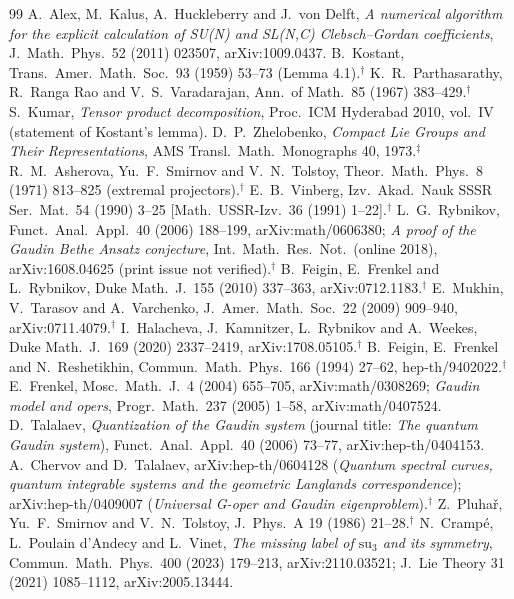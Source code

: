 \documentclass[11pt]{article}
\begin{document}
{\scriptsize
\begin{thebibliography}{99}
 A.~Alex, M.~Kalus, A.~Huckleberry and J.~von Delft, \emph{A numerical algorithm for the explicit calculation of SU(N) and SL(N,C) Clebsch--Gordan coefficients}, J.~Math.\ Phys.\ 52 (2011) 023507, arXiv:1009.0437.
 B.~Kostant, Trans.\ Amer.\ Math.\ Soc.\ 93 (1959) 53--73 (Lemma 4.1).$^\dagger$
 K.~R.~Parthasarathy, R.~Ranga Rao and V.~S.~Varadarajan, Ann.\ of Math.\ 85 (1967) 383--429.$^\dagger$
 S.~Kumar, \emph{Tensor product decomposition}, Proc.\ ICM Hyderabad 2010, vol.~IV (statement of Kostant's lemma).
 D.~P.~Zhelobenko, \emph{Compact Lie Groups and Their Representations}, AMS Transl.\ Math.\ Monographs 40, 1973.$^\ddagger$
 R.~M.~Asherova, Yu.~F.~Smirnov and V.~N.~Tolstoy, Theor.\ Math.\ Phys.\ 8 (1971) 813--825 (extremal projectors).$^\dagger$
 E.~B.~Vinberg, Izv.\ Akad.\ Nauk SSSR Ser.\ Mat.\ 54 (1990) 3--25 [Math.\ USSR-Izv.\ 36 (1991) 1--22].$^\dagger$
 L.~G.~Rybnikov, Funct.\ Anal.\ Appl.\ 40 (2006) 188--199, arXiv:math/0606380; \emph{A proof of the Gaudin Bethe Ansatz conjecture}, Int.\ Math.\ Res.\ Not.\ (online 2018), arXiv:1608.04625 (print issue not verified).$^\dagger$
 B.~Feigin, E.~Frenkel and L.~Rybnikov, Duke Math.\ J.\ 155 (2010) 337--363, arXiv:0712.1183.$^\dagger$
 E.~Mukhin, V.~Tarasov and A.~Varchenko, J.~Amer.\ Math.\ Soc.\ 22 (2009) 909--940, arXiv:0711.4079.$^\dagger$
 I.~Halacheva, J.~Kamnitzer, L.~Rybnikov and A.~Weekes, Duke Math.\ J.\ 169 (2020) 2337--2419, arXiv:1708.05105.$^\dagger$
 B.~Feigin, E.~Frenkel and N.~Reshetikhin, Commun.\ Math.\ Phys.\ 166 (1994) 27--62, hep-th/9402022.$^\dagger$
 E.~Frenkel, Mosc.\ Math.\ J.\ 4 (2004) 655--705, arXiv:math/0308269; \emph{Gaudin model and opers}, Progr.\ Math.\ 237 (2005) 1--58, arXiv:math/0407524.
 D.~Talalaev, \emph{Quantization of the Gaudin system} (journal title: \emph{The quantum Gaudin system}), Funct.\ Anal.\ Appl.\ 40 (2006) 73--77, arXiv:hep-th/0404153.
 A.~Chervov and D.~Talalaev, arXiv:hep-th/0604128 (\emph{Quantum spectral curves, quantum integrable systems and the geometric Langlands correspondence}); arXiv:hep-th/0409007 (\emph{Universal G-oper and Gaudin eigenproblem}).$^\dagger$
 Z.~Pluha\v{r}, Yu.~F.~Smirnov and V.~N.~Tolstoy, J.~Phys.\ A 19 (1986) 21--28.$^\dagger$
 N.~Cramp\'e, L.~Poulain d'Andecy and L.~Vinet, \emph{The missing label of $\mathrm{su}_3$ and its symmetry}, Commun.\ Math.\ Phys.\ 400 (2023) 179--213, arXiv:2110.03521; J.~Lie Theory 31 (2021) 1085--1112, arXiv:2005.13444.

\end{thebibliography}}
\end{document}
